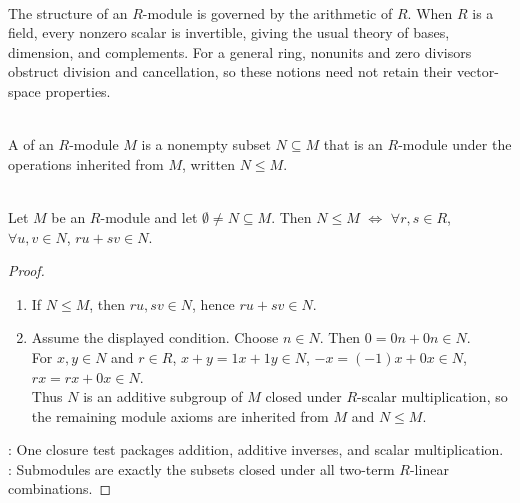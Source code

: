 \begin{perspective} \label{per:base-ring-controls-modules} \\
The structure of an $R$-module is governed by the arithmetic of $R$. When $R$ is a field, every nonzero scalar is invertible, giving the usual theory of bases, dimension, and complements. For a general ring, nonunits and zero divisors obstruct division and cancellation, so these notions need not retain their vector-space properties.
\end{perspective}

\begin{definition} \label{def:submodule} \\
A  of an $R$-module $M$ is a nonempty subset $N\subseteq M$ that is an $R$-module under the operations inherited from $M$, written $N\leq M$.
\end{definition}

\begin{theorem} \label{thm:submodule-test} \\
Let $M$ be an $R$-module and let $\emptyset\neq N\subseteq M$. Then $N\leq M$ $\Longleftrightarrow$ $\forall r,s\in R$, $\forall u,v\in N$, $ru+sv\in N$.
\begin{proof}
\begin{enumerate}[label=\roman*.]
\setlength{\itemsep}{0pt}
\item[$(\Rightarrow)$] If $N\leq M$, then $ru,sv\in N$, hence $ru+sv\in N$.
\item[$(\Leftarrow)$] Assume the displayed condition. Choose $n\in N$. Then $0=0n+0n\in N$.\\
For $x,y\in N$ and $r\in R$, $x+y=1x+1y\in N$, $-x=(-1)x+0x\in N$, $rx=rx+0x\in N$.\\
Thus $N$ is an additive subgroup of $M$ closed under $R$-scalar multiplication, so the remaining module axioms are inherited from $M$ and $N\leq M$.
\end{enumerate}
: One closure test packages addition, additive inverses, and scalar multiplication.\\
: Submodules are exactly the subsets closed under all two-term $R$-linear combinations.
\end{proof}
\end{theorem}

